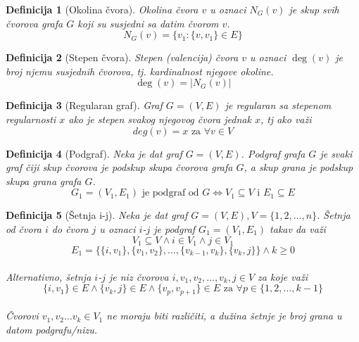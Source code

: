 \documentclass[11pt]{article}
\newtheorem{definition}{Definicija}
\begin{document}
		\begin{definition}[Okolina čvora]
		Okolina čvora $v$ u oznaci $N_G(v)$ je skup svih čvorova grafa $G$ koji su susjedni sa datim čvorom $v$.
		\[N_G(v) = \{ v_1 : \{v, v_1\} \in E\}\]
		\end{definition}
	
		\begin{definition}[Stepen čvora]
		Stepen (valencija) čvora $v$ u oznaci $\deg(v)$ je broj njemu susjednih čvorova, tj. kardinalnost njegove okoline.
		\[\deg(v) = |N_G(v)|\]
		\end{definition}
		
		\begin{definition}[Regularan graf]
		Graf $G=(V,E)$ je regularan sa stepenom regularnosti $x$ ako je stepen svakog njegovog čvora jednak $x$, tj ako važi 
		\[ deg(v) = x \text{ za } \forall v \in V \]
		\end{definition}
	
		\begin{definition}[Podgraf]
		Neka je dat graf $G = (V, E)$. Podgraf grafa $G$ je svaki graf čiji skup čvorova je podskup skupa čvorova grafa $G$, a skup grana je podskup skupa grana grafa $G$.
		\[ G_1 = (V_1, E_1) \text{ je podgraf od } G \Leftrightarrow V_1 \subseteq V \text{ i } E_1 \subseteq E \]
		\end{definition}
	
		\begin{definition}[Šetnja i-j]
		Neka je dat graf $G = (V, E), V = \{1, 2, \dots, n\}$. Šetnja od čvora $i$ do čvora $j$ u oznaci $i$-$j$ je podgraf $G_1 = (V_1, E_1)$ takav da važi 
		\[
		 	V_1 \subseteq V \land  i \in V_1 \land j \in V_1
		\]
		\[ 
		 	E_1 = \{\{i,v_1\},\{v_1,v_2\},\dots,\{v_{k-1},v_k\},\{v_k,j\}\} \land k \geq 0
		\] 
			\paragraph{}
			Alternativno, šetnja $i$-$j$ je niz čvorova $i, v_1, v_2, \dots, v_k, j \in V$ za koje važi 
			\[
				\{i,v_1\} \in E \land \{v_k,j\} \in E \land \{v_p,v_{p+1}\} \in E \text{ za } \forall p \in \{1,2, \dots, k-1\} 
			\]
			\paragraph{}
			Čvorovi $v_1,v_2 \dots v_k \in V_1 $ ne moraju biti različiti, a dužina šetnje je broj grana u datom podgrafu/nizu.
		\end{definition}
	
\end{document}
